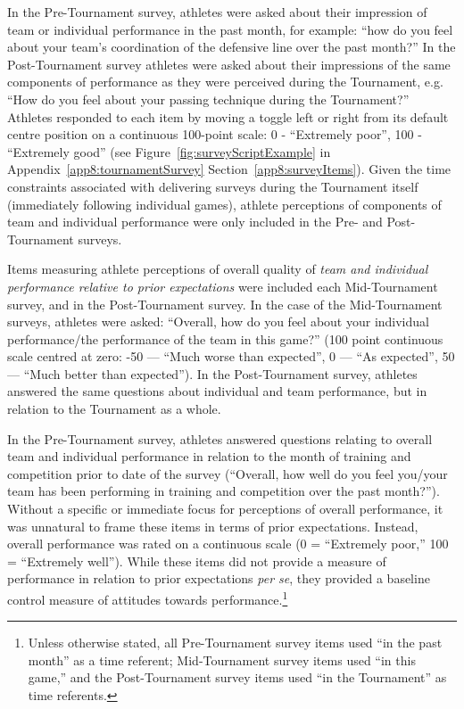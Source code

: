 \begin{CJK}{UTF8}{gbsn}



In the Pre-Tournament survey, athletes were asked about their impression of team or individual performance in the past month, for example: ``how do you feel about your team's coordination of the defensive line over the past month?''  In the Post-Tournament survey athletes were asked about their impressions of the same components of performance as they were perceived during the Tournament, e.g. ``How do you feel about your passing technique during the Tournament?'' Athletes responded to each item by moving a toggle left or right from its default centre position on a continuous 100-point scale: 0 - ``Extremely poor'', 100 - ``Extremely good'' (see Figure~\ref{fig:surveyScriptExample} in Appendix~\ref{app8:tournamentSurvey} Section~\ref{app8:surveyItems}).  Given the time constraints associated with delivering surveys during the Tournament itself (immediately following individual games), athlete perceptions of components of team and individual performance were only included in the Pre- and Post-Tournament surveys.

Items measuring athlete perceptions of overall quality of \textit{team and individual performance relative to prior expectations} were included each Mid-Tournament survey, and in the Post-Tournament survey.  In the case of the Mid-Tournament surveys, athletes were asked: ``Overall, how do you feel about your individual performance/the performance of the team in this game?'' (100 point continuous scale centred at zero: -50 --- ``Much worse than expected'', 0 --- ``As expected'', 50 ---  ``Much better than expected''). In the Post-Tournament survey, athletes answered the same questions about individual and team performance, but in relation to the Tournament as a whole.

In the Pre-Tournament survey, athletes answered questions relating to overall team and individual performance in relation to the month of training and competition prior to date of the survey (``Overall, how well do you feel you/your team has been performing in training and competition over the past month?'').
Without a specific or immediate focus for perceptions of overall performance, it was unnatural to frame these items in terms of prior expectations.  Instead, overall performance was rated on a continuous scale (0 = ``Extremely poor,'' 100 = ``Extremely well'').  While these items did not provide a measure of performance in relation to prior expectations \textit{per se}, they provided a baseline control measure of attitudes towards performance.\footnote{Unless otherwise stated, all Pre-Tournament survey items used ``in the past month'' as a time referent; Mid-Tournament survey items used ``in this game,'' and the Post-Tournament survey items used ``in the Tournament'' as time referents.}




\end{CJK}

